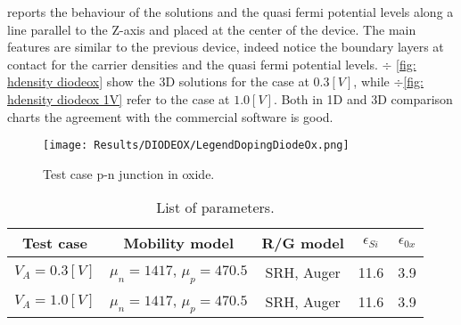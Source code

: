  reports the behaviour of the solutions and the quasi fermi potential levels along a line parallel to the Z-axis and placed at the center of the device. The main features are similar to the previous device, indeed notice the boundary layers at contact for the carrier densities and the quasi fermi potential levels.
 $\div$ \ref{fig: hdensity diodeox} show the 3D solutions for the case at $0.3[V]$, while $\div$\ref{fig: hdensity diodeox 1V} refer to the case at $1.0[V]$. Both in 1D and 3D comparison charts the agreement with the commercial software is good. 

\vspace{0.5cm}

\begin{figure}[!h]
\centering
{}
\hspace{0.06\textwidth}
\hspace{0.04\textwidth}
{\texttt{[image: Results/DIODEOX/LegendDopingDiodeOx.png]}}
\caption{Test case p-n junction in oxide.}
\label{fig: structure diodeox}
\end{figure}


\vspace{0.5cm}

\begin{table}[!h]
\centering
\begin{tabular}{ccccc}
\toprule
 Test case & Mobility model & R/G model & $\epsilon_{Si}$ & $\epsilon_{0x}$  \\
\midrule
$V_A=0.3 [V]$ & $\mu_n = 1417$, $\mu_p = 470.5$ & SRH, Auger & 11.6 & 3.9 \\
$V_A=1.0 [V]$ & $\mu_n = 1417$, $\mu_p = 470.5$ & SRH, Auger & 11.6 & 3.9 \\\bottomrule
\end{tabular}
\caption{List of parameters.}
\label{tab: diodeox 3d}
\end{table}




